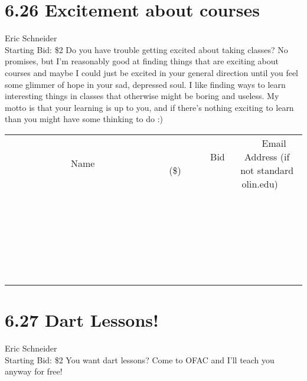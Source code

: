 \documentclass[11pt]{article}
\begin{document}
\section*{6.26 Excitement about courses}
Eric Schneider
\\
Starting Bid: \$2
\newline
Do you have trouble getting excited about taking classes? No promises, but I'm reasonably good at finding things that are exciting about courses and maybe I could just be excited in your general direction until you feel some glimmer of hope in your sad, depressed soul. I like finding ways to learn interesting things in classes that otherwise might be boring and useless. My motto is that your learning is up to you, and if there's nothing exciting to learn than you might have some thinking to do :)
\\[6ex]
\begin{tabular}{c c c}
~~~~~~~~~~~~~Name~~~~~~~~~~~~~ & ~~~~~~~~~Bid (\$)~~~~~~~~~  & ~~~Email Address (if not standard olin.edu)~~~\\
 & & \\
\hline
 & & \\
\hline
 & & \\
\hline
 & & \\
\hline
 & & \\
\hline
 & & \\
\hline
 & & \\
\hline
 & & \\
\hline
 & & \\
\hline
 & & \\
\hline
 & & \\
\hline
 & & \\
\hline
 & & \\
\hline
 & & \\
\hline
 & & \\
\hline
 & & \\
\hline
 & & \\
\hline
 & & \\
\hline
 & & \\
\hline
 & & \\
\hline
 & & \\
\hline
 & & \\
\hline
 & & \\
\hline
 & & \\
\hline
 & & \\
\hline
 & & \\
\hline
\end{tabular}
\newpage
\section*{6.27 Dart Lessons!}
Eric Schneider
\\
Starting Bid: \$2
\newline
You want dart lessons? Come to OFAC and I'll teach you anyway for free!
\end{document}
